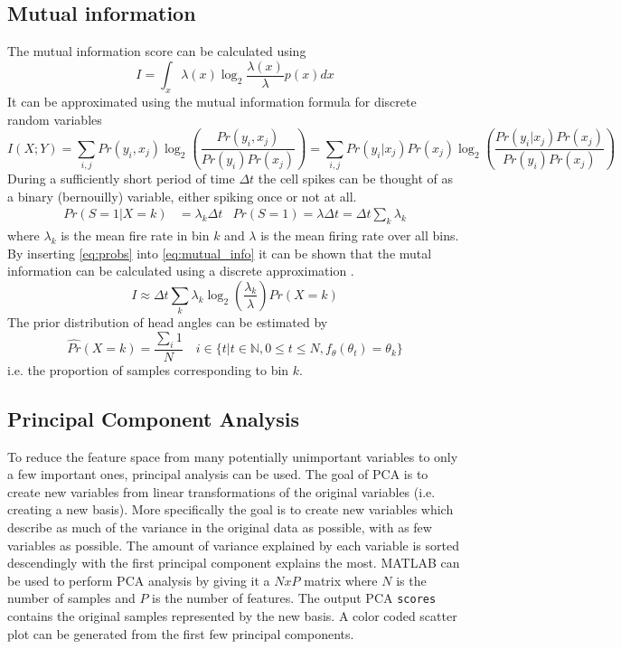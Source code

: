 \subsection{Mutual information}
The mutual information score can be calculated using 
\begin{equation} \label{eq:mutinfo_cont}
    I = \int_x \lambda(x) \log_2{\frac{\lambda(x)}{\lambda}}p(x) dx
\end{equation}
It can be approximated using the mutual information formula for discrete random variables
\begin{equation}\label{eq:mutual_info}
    I(X;Y) = \sum_{i, j} Pr(y_i,x_j) \log_2(\frac{Pr(y_i, x_j)}{Pr(y_i)Pr(x_j)}) = \sum_{i,j}Pr(y_i|x_j)Pr(x_j) \log_2(\frac{Pr(y_i | x_j)Pr(x_j)}{Pr(y_i)Pr(x_j)})
\end{equation}
During a sufficiently short period of time $\Delta t$ the cell spikes can be thought of as a binary (bernouilly) variable, either spiking once or not at all. \cite{mutualinfo}
\begin{align} \label{eq:probs}
    Pr(S=1 | X = k) &= \lambda_k \Delta t & Pr(S=1) = \lambda \Delta t = \Delta t \sum_k \lambda_k
\end{align}
where $\lambda_k$ is the mean fire rate in bin $k$ and $\lambda$ is the mean firing rate over all bins.
By inserting \cref{eq:probs} into \cref{eq:mutual_info} it can be shown that the mutal information can be calculated using a discrete approximation \cite{mutualinfo}.
\begin{equation} \label{eq:mutinfo_disc}
    I \approx \Delta t \sum_k \lambda_k \log_2(\frac{\lambda_k}{\lambda})Pr(X = k)
\end{equation}
The prior distribution of head angles can be estimated by
\begin{equation}
    \hat{Pr}(X = k) = \frac{\sum_i 1}{N}  \quad i \in \{t | t \in \mathbb{N}, 0 \leq t \leq N, f_\theta(\theta_t) = \theta_k\}
\end{equation}
i.e. the proportion of samples corresponding to bin $k$.

\subsection{Principal Component Analysis}
To reduce the feature space from many potentially unimportant variables to only a few important ones, principal analysis can be used. 
The goal of PCA is to create new variables from linear transformations of the original variables (i.e. creating a new basis). More specifically the goal is to create new variables which describe as much of the variance in the original data as possible, with as few variables as possible. 
The amount of variance explained by each variable is sorted descendingly with the first principal component explains the most. MATLAB can be used to perform PCA analysis by giving it a $NxP$ matrix where $N$ is the number of samples and $P$ is the number of features. The output PCA \texttt{scores} contains the original samples represented by the new basis.  
A color coded scatter plot can be generated from the first few principal components. 
